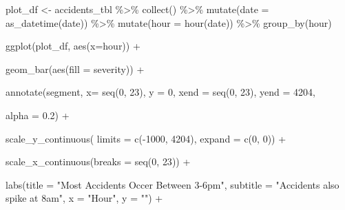 \documentclass[
]{article}
\newenvironment{Shaded}{\begin{snugshade}}{\end{snugshade}}
\newcommand{\AttributeTok}[1]{\textcolor[rgb]{0.77,0.63,0.00}{#1}}
\newcommand{\DecValTok}[1]{\textcolor[rgb]{0.00,0.00,0.81}{#1}}
\newcommand{\FloatTok}[1]{\textcolor[rgb]{0.00,0.00,0.81}{#1}}
\newcommand{\FunctionTok}[1]{\textcolor[rgb]{0.00,0.00,0.00}{#1}}
\newcommand{\NormalTok}[1]{#1}
\newcommand{\OtherTok}[1]{\textcolor[rgb]{0.56,0.35,0.01}{#1}}
\newcommand{\SpecialCharTok}[1]{\textcolor[rgb]{0.00,0.00,0.00}{#1}}
\newcommand{\StringTok}[1]{\textcolor[rgb]{0.31,0.60,0.02}{#1}}
\begin{document}
\begin{Shaded}
\begin{Highlighting}[]
\NormalTok{plot\_df }\OtherTok{\textless{}{-}}\NormalTok{ accidents\_tbl }\SpecialCharTok{\%\textgreater{}\%} 
    \FunctionTok{collect}\NormalTok{() }\SpecialCharTok{\%\textgreater{}\%} 
    \FunctionTok{mutate}\NormalTok{(}\AttributeTok{date =} \FunctionTok{as\_datetime}\NormalTok{(date)) }\SpecialCharTok{\%\textgreater{}\%}
    \FunctionTok{mutate}\NormalTok{(}\AttributeTok{hour =} \FunctionTok{hour}\NormalTok{(date)) }\SpecialCharTok{\%\textgreater{}\%}
    \FunctionTok{group\_by}\NormalTok{(hour)}
  
  
  \FunctionTok{ggplot}\NormalTok{(plot\_df, }\FunctionTok{aes}\NormalTok{(}\AttributeTok{x=}\NormalTok{hour)) }\SpecialCharTok{+}
    
    \FunctionTok{geom\_bar}\NormalTok{(}\FunctionTok{aes}\NormalTok{(}\AttributeTok{fill =}\NormalTok{ severity)) }\SpecialCharTok{+}
    
    \FunctionTok{annotate}\NormalTok{(}\StringTok{\textquotesingle{}segment\textquotesingle{}}\NormalTok{, }
             \AttributeTok{x=} \FunctionTok{seq}\NormalTok{(}\DecValTok{0}\NormalTok{, }\DecValTok{23}\NormalTok{),}
             \AttributeTok{y =} \DecValTok{0}\NormalTok{, }
             \AttributeTok{xend =} \FunctionTok{seq}\NormalTok{(}\DecValTok{0}\NormalTok{, }\DecValTok{23}\NormalTok{),}
             \AttributeTok{yend =} \DecValTok{4204}\NormalTok{, }
             
             \AttributeTok{alpha =} \FloatTok{0.2}\NormalTok{) }\SpecialCharTok{+}

    \FunctionTok{scale\_y\_continuous}\NormalTok{(}
      \AttributeTok{limits =} \FunctionTok{c}\NormalTok{(}\SpecialCharTok{{-}}\DecValTok{1000}\NormalTok{, }\DecValTok{4204}\NormalTok{),}
      \AttributeTok{expand =} \FunctionTok{c}\NormalTok{(}\DecValTok{0}\NormalTok{, }\DecValTok{0}\NormalTok{)) }\SpecialCharTok{+}
    
    \FunctionTok{scale\_x\_continuous}\NormalTok{(}\AttributeTok{breaks =} \FunctionTok{seq}\NormalTok{(}\DecValTok{0}\NormalTok{, }\DecValTok{23}\NormalTok{)) }\SpecialCharTok{+}
    
    \FunctionTok{labs}\NormalTok{(}\AttributeTok{title =} \StringTok{"Most Accidents Occer Between 3{-}6pm"}\NormalTok{,}
         \AttributeTok{subtitle =} \StringTok{"Accidents also spike at 8am"}\NormalTok{,}
         \AttributeTok{x =} \StringTok{"Hour"}\NormalTok{,}
         \AttributeTok{y =} \StringTok{""}\NormalTok{) }\SpecialCharTok{+}
    

\end{Highlighting}
\end{Shaded}
\end{document}
